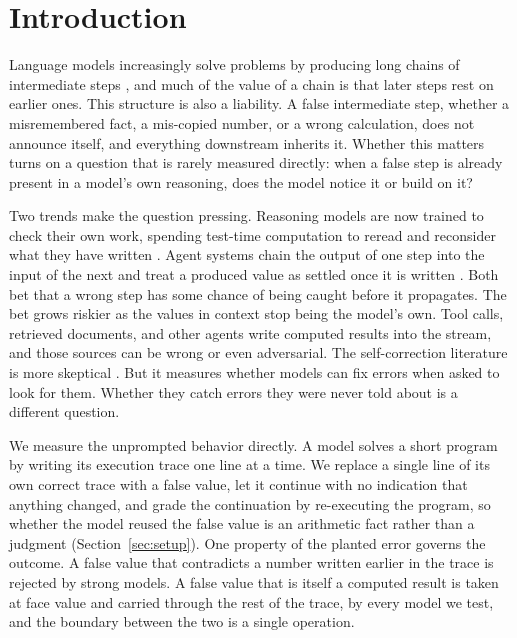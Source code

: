 \section{Introduction}
\label{sec:intro}

Language models increasingly solve problems by producing long chains of intermediate steps \citep{nye2021scratchpad,wei2022cot,kojima2022zeroshot}, and much of the value of a chain is that later steps rest on earlier ones. This structure is also a liability. A false intermediate step, whether a misremembered fact, a mis-copied number, or a wrong calculation, does not announce itself, and everything downstream inherits it. Whether this matters turns on a question that is rarely measured directly: when a false step is already present in a model's own reasoning, does the model notice it or build on it?

Two trends make the question pressing. Reasoning models are now trained to check their own work, spending test-time computation to reread and reconsider what they have written \citep{deepseekr1,snell2024testtime}. Agent systems chain the output of one step into the input of the next and treat a produced value as settled once it is written \citep{yao2023react,kapoor2024agents}. Both bet that a wrong step has some chance of being caught before it propagates. The bet grows riskier as the values in context stop being the model's own. Tool calls, retrieved documents, and other agents write computed results into the stream, and those sources can be wrong or even adversarial. The self-correction literature is more skeptical \citep{huang2024,stechly2024selfverification,tsui2025}. But it measures whether models can fix errors when asked to look for them. Whether they catch errors they were never told about is a different question.

We measure the unprompted behavior directly. A model solves a short program by writing its execution trace one line at a time. We replace a single line of its own correct trace with a false value, let it continue with no indication that anything changed, and grade the continuation by re-executing the program, so whether the model reused the false value is an arithmetic fact rather than a judgment (Section~\ref{sec:setup}). One property of the planted error governs the outcome. A false value that contradicts a number written earlier in the trace is rejected by strong models. A false value that is itself a computed result is taken at face value and carried through the rest of the trace, by every model we test, and the boundary between the two is a single operation.

